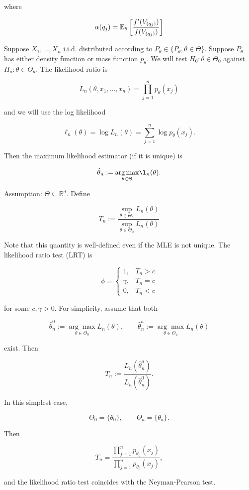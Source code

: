 where

\[
\alpha(q_j) = \E_\theta \left[  \frac{f'(V_{(q_j)})}{f(V_{(q_j)})}\right]
\]

Suppose \(X_1, \ldots, X_n\) i.i.d. distributed according to \(P_\theta \in \{P_\theta, \theta \in \Theta\}\). Suppose \(P_\theta\) has either density function or mass function \(p_\theta\). We will test \(H_0: \theta \in \Theta_0\) against \(H_a: \theta \in \Theta_a\). The likelihood ratio is 

\[
L_n(\theta, x_1, \ldots, x_n) = \prod_{j=1}^n p_\theta(x_j)
\]

and we will use the log likelihood

\[
\ell_n(\theta) = \log L_n(\theta) = \sum_{j=1}^n \log p_\theta(x_j).
\]

Then the maximum likelihood estimator (if it is unique) is 

\[
\hat{\theta}_n := \underset{\theta \in \Theta}{\arg \max} \l_n (\theta).
\]

\begin{definition}

Assumption: \(\Theta \subseteq \mathbb{R}^d\). Define

\[
T_n := \frac{\sup_{\theta \in \Theta_a} L_n(\theta)}{\sup_{\theta \in \Theta_0} L_n(\theta)}
\]

Note that this quantity is well-defined even if the MLE is not unique. The likelihood ratio test (LRT) is 

\[
\phi = \begin{cases}
1, & T_n > c\\
\gamma, & T_n = c \\
0, & T_n < c
\end{cases}
\]

for some \(c, \gamma > 0\). For simplicity, assume that both

\[
\hat{\theta}_n^0 := \underset{\theta \in \Theta_0}{\arg \max} L_n (\theta), \qquad \hat{\theta}_n^a := \underset{\theta \in \Theta_a}{\arg \max} L_n (\theta)
\]

exist. Then 

\[
T_n := \frac{L_n(\hat{\theta}_n^a)}{L_n(\hat{\theta}_n^0)}.
\]

\end{definition}

\begin{remark}

In this simplest case,

\[
\Theta_0 = \{\theta_0\}, \qquad \Theta_a = \{\theta_a\}.
\]

Then

\[
T_n = \frac{\prod_{j=1}^n p_{\theta_a}(x_j)}{\prod_{j=1}^n p_{\theta_0}(x_j)},
\]

and the likelihood ratio test coincides with the Neyman-Pearson test.

\end{remark}

